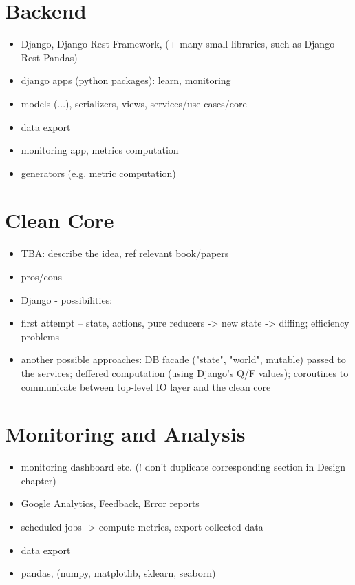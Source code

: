 \section{Backend}

\begin{itemize}
\item Django, Django Rest Framework, (+ many small libraries, such as Django Rest Pandas)
\item django apps (python packages): learn, monitoring
\item models (...), serializers, views, services/use cases/core
\item data export
\item monitoring app, metrics computation
\item generators (e.g. metric computation)
\end{itemize}

\section{Clean Core}

\begin{itemize}
\item TBA: describe the idea, ref relevant book/papers
\item pros/cons
\item Django - possibilities:
\item first attempt -- state, actions, pure reducers -> new state -> diffing; efficiency problems
\item another possible approaches: DB facade ("state", "world", mutable) passed to the services;
  deffered computation (using Django's Q/F values); coroutines to communicate between top-level IO layer and the clean core
\end{itemize}


\section{Monitoring and Analysis}

\begin{itemize}
\item monitoring dashboard etc. (! don't duplicate corresponding section in Design chapter)
\item Google Analytics, Feedback, Error reports
\item scheduled jobs -> compute metrics, export collected data
\item data export
\item pandas, (numpy, matplotlib, sklearn, seaborn)
\end{itemize}


